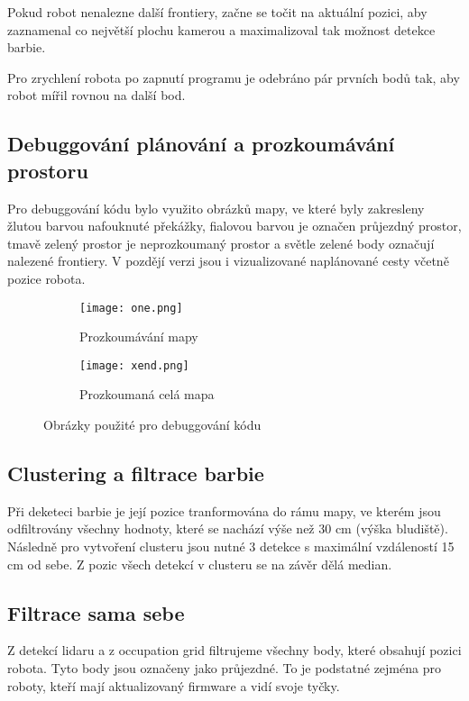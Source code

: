 \documentclass[twocolumn]{journal}
\begin{document}
    Pokud robot nenalezne další frontiery, začne se točit na aktuální pozici, aby zaznamenal co největší plochu kamerou a maximalizoval tak možnost detekce barbie. 
    
    Pro zrychlení robota po zapnutí programu je odebráno pár prvních bodů tak, aby robot mířil rovnou na další bod. 
    
\subsection{Debuggování plánování a prozkoumávání prostoru}
Pro debuggování kódu bylo využito obrázků mapy, ve které byly zakresleny žlutou barvou nafouknuté překážky, fialovou barvou je označen průjezdný prostor, tmavě zelený prostor je neprozkoumaný prostor a světle zelené body označují nalezené frontiery. V pozdějí verzi jsou i vizualizované naplánované cesty včetně pozice robota. 
\begin{figure}[!h]
     \centering
     \begin{subfigure}[b]{0.24\textwidth}
         \centering
         \texttt{[image: one.png]}
         \caption{Prozkoumávání mapy}
     \end{subfigure}
     \begin{subfigure}[b]{0.24\textwidth}
         \centering
         \texttt{[image: xend.png]}
         \caption{Prozkoumaná celá mapa}
     \end{subfigure}
        \caption{Obrázky použité pro debuggování kódu}
        \label{fig:front_plan}
    \end{figure}
    
\subsection{Clustering a filtrace barbie}
    Při deketeci barbie je její pozice tranformována do rámu mapy, ve kterém jsou odfiltrovány všechny hodnoty, které se nachází výše než 30 cm (výška bludiště). Následně pro vytvoření clusteru jsou nutné 3 detekce s maximální vzdáleností 15 cm od sebe. Z pozic všech detekcí v clusteru se na závěr dělá median.  

\subsection{Filtrace sama sebe}
    Z detekcí lidaru a z occupation grid filtrujeme všechny body, které obsahují pozici robota. Tyto body jsou označeny jako průjezdné. To je podstatné zejména pro roboty, kteří mají aktualizovaný firmware a vidí svoje tyčky.
\end{document}
